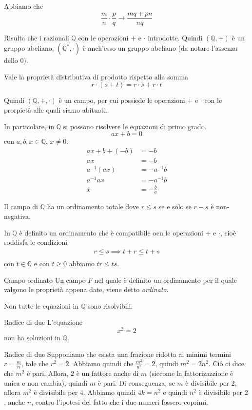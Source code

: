 \documentclass[a4paper]{article}
\begin{document}
Abbiamo che
\[
    \frac{m}{n} \cdot \frac{p}{q} \to \frac{mq+pn}{nq}
\]

Risulta che i razionali \(\mathbb{Q}\) con le operazioni \(+\) e \(\cdot\) introdotte.
Quindi \((\mathbb{Q}, +)\) è un gruppo abeliano, \(({\mathbb{Q}}^*, \cdot)\) è anch'esso un gruppo abeliano
(da notare l'assenza dello 0).

Vale la proprietà distributiva di prodotto rispetto alla somma
\[ r\cdot (s+t) = r\cdot s + r\cdot t \]

Quindi \((\mathbb{Q}, +, \cdot)\) è un campo, per cui possiede le operazioni \(+\) e \(\cdot\)
con le prorpietà alle quali siamo abituati.

\pagebreak

In particolare, in \(\mathbb{Q}\) si possono risolvere le equazioni di primo grado.
\[
    ax+b=0
\]
con \(a,b,x\in\mathbb{Q}\), \(x\neq 0\).
\begin{align*}
    ax+b+(-b)&=-b \\
    ax&= -b \\
    a^{-1}(ax) &= -a^{-1}b \\
    a^{-1}ax &= -a^{-1}b \\
    x &= -\frac{b}{a} 
\end{align*}

Il campo di \(\mathbb{Q}\) ha un ordinamento totale dove \(r \leq s\) se e solo se \(r - s\) è
non-negativa.

In \(\mathbb{Q}\) è definito un ordinamento che è compatibile ocn le operazioni \(+\) e \(\cdot\),
cioè soddisfa le condizioni
\begin{align*}
    r \leq s \implies t + r \leq t + s \\
\end{align*}
con \(t\in \mathbb{Q}\) e con \(t \geq 0\) abbiamo \(tr \leq ts\).

\begin{snippetdefinition}{Campo ordinato}
    Un campo \(F\) nel quale è definito un ordinamento per il quale valgono le proprietà
    appena date, viene detto \textit{ordinato}.
\end{snippetdefinition}

Non tutte le equazioni in \(\mathbb{Q}\) sono risolvibili.

\begin{snippettheorem}{Radice di due}
    L'equazione \[ x^2 = 2 \] non ha soluzioni in \(\mathbb{Q}\).
\end{snippettheorem}

\begin{snippetproof}{Radice di due}
    Supponiamo che esista una frazione ridotta ai minimi termini \(r = \frac{m}{n}\),
    tale che \(r^2 = 2\). Abbiamo quindi che \(\frac{m^2}{n^2} = 2\), quindi \(m^2 = 2n^2\).
    Ciô ci dice che \(m^2\) è pari. Allora, \(2\) è un fattore anche di \(m\) (siccome la fattorizazzione è unica e non cambia),
    quindi \(m\) è pari. Di conseguenza, se \(m\) è divisibile per \(2\), allora \(m^2\) è divisibile per \(4\).
    Abbiamo quindi \(4k=n^2\) e quindi \(n^2\) è divisibile per \(2\), anche \(n\),
    contro l'ipotesi del fatto che i due numeri fossero coprimi.
\end{snippetproof}
\end{document}
